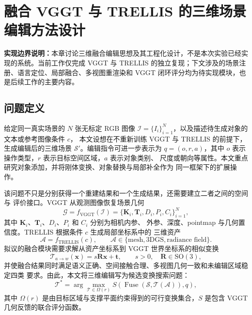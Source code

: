 \section{融合 VGGT 与 TRELLIS 的三维场景编辑方法设计}

\noindent\textbf{实现边界说明：}本章讨论三维融合编辑思想及其工程化设计，不是本次实验已经实现的系统。当前工作仅完成 VGGT 与 TRELLIS 的独立复现；下文涉及的场景注册、语言定位、局部融合、多视图重渲染和 VGGT 闭环评分均为待实现模块，也是后续工作的主要内容。

\subsection{问题定义}

给定同一真实场景的 $N$ 张无标定 RGB 图像
$\mathcal{I}=\{I_i\}_{i=1}^{N}$，以及描述待生成对象的文本或参考图像条件 $c$，
本文设想在不重新训练 VGGT 与 TRELLIS 的前提下，生成编辑后的三维场景
$\mathcal{S}'$。编辑指令可进一步表示为
$q=(o,r,a)$，其中 $o$ 表示操作类型，$r$ 表示目标空间区域，$a$ 表示对象类别、
尺度或朝向等属性。本文重点研究对象添加，并将刚体变换、对象替换与局部补全作为
同一框架下的扩展操作。

该问题不只是分别获得一个重建结果和一个生成结果，还需要建立二者之间的空间与
评价接口。VGGT 从观测图像恢复场景几何
\begin{equation}
  \mathcal{G}
  =f_{\mathrm{VGGT}}(\mathcal{I})
  =\{\mathbf{K}_i,\mathbf{T}_i,D_i,P_i,C_i\}_{i=1}^{N},
\end{equation}
其中 $\mathbf{K}_i$、$\mathbf{T}_i$、$D_i$、$P_i$ 和 $C_i$ 分别为相机内参、
外参、深度、pointmap 与几何置信度。TRELLIS 根据条件 $c$ 生成局部坐标系中的
三维资产
\begin{equation}
  \mathcal{A}=f_{\mathrm{TRELLIS}}(c),
  \qquad \mathcal{A}\in\{\text{mesh},\text{3DGS},\text{radiance field}\}.
\end{equation}
拟议的融合模块需要求解从资产坐标系到 VGGT 世界坐标系的相似变换
\begin{equation}
  \mathcal{T}_{a\rightarrow w}(\mathbf{x})
  =s\mathbf{R}\mathbf{x}+\mathbf{t},
  \qquad s>0,\quad \mathbf{R}\in \mathrm{SO}(3),
\end{equation}
并使融合结果同时满足语义正确、空间接触合理、多视图几何一致和未编辑区域稳定四类
要求。由此，本文将三维编辑写为候选变换搜索问题：
\begin{equation}
  \mathcal{T}^{*}
  =\arg\max_{\mathcal{T}\in\Omega(r)}
  S\!\left(\operatorname{Fuse}
  (\mathcal{S},\mathcal{T}(\mathcal{A})),q\right),
\end{equation}
其中 $\Omega(r)$ 是由目标区域与支撑平面约束得到的可行变换集合，$S$ 是包含
VGGT 几何反馈的联合评分函数。

